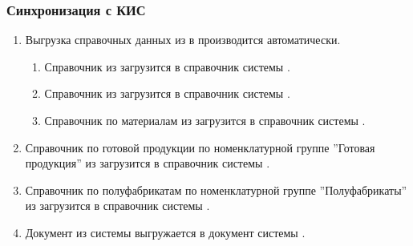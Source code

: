 \subsubsection{Синхронизация с КИС}
\label{bp:sales_integration}


\begin{enumerate}
\item Выгрузка справочных данных из \erp в \gofro производится автоматически.
\begin{enumerate}
\item 	Справочник   из \erp загрузится в справочник   системы \gofro.
\item	Справочник   из \erp загрузится в справочник   системы \gofro.
\item	Справочник   по материалам из \erp загрузится в справочник   системы \gofro.
\end{enumerate}


 \item	Справочник   по готовой продукции по номенклатурной группе ''Готовая продукция'' из \gofro загрузится в справочник   системы \erp.
 \item	Справочник   по полуфабрикатам по номенклатурной группе ''Полуфабрикаты'' из \gofro загрузится в справочник   системы \erp.

\item	Документ  из системы \gofro  выгружается в документ  системы \erp. 



\end{enumerate}